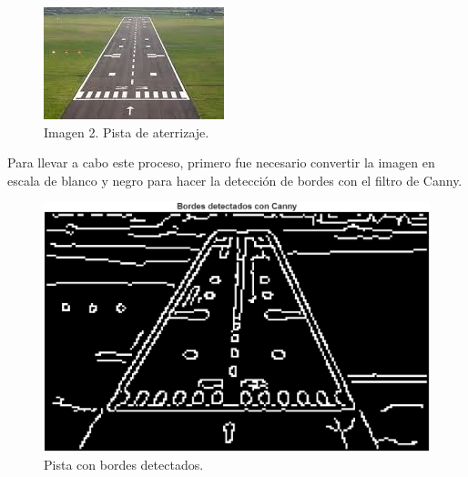 \documentclass[11pt, letterpaper]{article}
\begin{document}
\begin{figure}[h!]
	\centering
	\begin{minipage}{0.7\textwidth}
		\centering
		\includegraphics[width=\textwidth]{IMG/G2.jpg}
		\caption*{Imagen 2. Pista de aterrizaje.}
	\end{minipage}\hfill
\end{figure}

Para llevar a cabo este proceso, primero fue necesario convertir la imagen en escala de blanco y negro para hacer la detección de bordes con el filtro de Canny.

\begin{figure}[h!]
	\centering
	\begin{minipage}{0.7\textwidth}
		\centering
		\includegraphics[width=\textwidth]{IMG/R2.png}
		\caption*{Pista con bordes detectados.}
	\end{minipage}\hfill
\end{figure}
\end{document}
